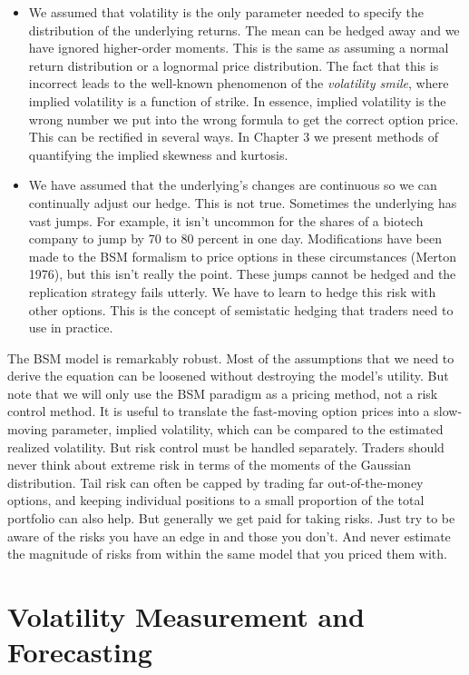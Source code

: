 \documentclass[11pt]{report}
\begin{document}
\begin{itemize}
			\item We assumed that volatility is the only parameter needed to specify the distribution of the underlying returns. The mean can be hedged away and we have ignored higher-order moments. This is the same as assuming a normal return distribution or a lognormal price distribution. The fact that this is incorrect leads to the well-known phenomenon of the \textit{volatility smile}, where implied volatility is a function of strike. In essence, implied volatility is the wrong number we put into the wrong formula to get the correct option price. This can be rectified in several ways. In Chapter 3 we present methods of quantifying the implied skewness and kurtosis.
			\item We have assumed that the underlying's changes are continuous so we can continually adjust our hedge. This is not true. Sometimes the underlying has vast jumps. For example, it isn't uncommon for the shares of a biotech company to jump by 70 to 80 percent in one day. Modifications have been made to the BSM formalism to price options in these circumstances (Merton 1976), but this isn't really the point. These jumps cannot be hedged and the replication strategy fails utterly. We have to learn to hedge this risk with other options. This is the concept of semistatic hedging that traders need to use in practice.
		\end{itemize}

		The BSM model is remarkably robust. Most of the assumptions that we need to derive the equation can be loosened without destroying the model's utility. But note that we will only use the BSM paradigm as a pricing method, not a risk control method. It is useful to translate the fast-moving option prices into a slow-moving parameter, implied volatility, which can be compared to the estimated realized volatility. But risk control must be handled separately. Traders should never think about extreme risk in terms of the moments of the Gaussian distribution. Tail risk can often be capped by trading far out-of-the-money options, and keeping individual positions to a small proportion of the total portfolio can also help. But generally we get paid for taking risks. Just try to be aware of the risks you have an edge in and those you don't. And never estimate the magnitude of risks from within the same model that you priced them with.

\chapter{Volatility Measurement and Forecasting}
	
\end{document}
